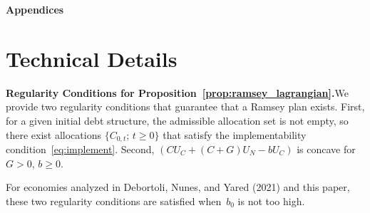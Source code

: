 \documentclass[12pt]{article}
\begin{document}
{%
%
%

\bigskip

\bigskip

\bigskip

\noindent\textbf{\Large Appendices}
\bigskip


\appendix

\section{Technical Details}\label{app:technical}

\noindent\textbf{Regularity Conditions for Proposition~\ref{prop:ramsey_lagrangian}.}\quad We provide two regularity conditions that guarantee that a Ramsey plan exists. First, for a given initial debt structure, the admissible allocation set is not empty, so there exist allocations $\{C_{0,t};\, t \ge 0\}$ that satisfy the implementability condition~\eqref{eq:implement}. Second, $(CU_C + (C+G)U_N - bU_C)$ is concave for $G > 0$, $b \ge 0$.

For economies analyzed in Debortoli, Nunes, and Yared (2021) and this paper, these two regularity conditions are satisfied when~$b_0$ is not too high.

}
\end{document}
